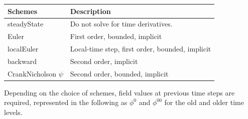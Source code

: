 \documentclass{article}
\begin{document}
\begin{tabular}{l | l}
\hline
Schemes & Description\\
\hline
steadyState & Do not solve for time derivatives. \\
Euler & First order, bounded, implicit \\
localEuler & Local-time step, first order, bounded, implicit \\
backward & Second order, implicit \\
CrankNicholson $\psi$ & Second order, bounded, implicit\\
\hline
\end{tabular}

Depending on the choice of schemes, field values at previous time steps are required, represented in the following as $\phi^0$ and $\phi^{00}$ for the old and older time levels. 
\end{document}
